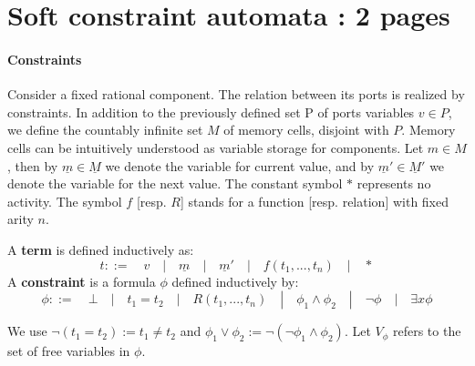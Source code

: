\section{Soft constraint automata : 2 pages}

\paragraph{Constraints}
Consider a fixed rational component. The relation between its ports is realized by constraints. In addition to the previously defined set P of ports variables $v\in P$, we define the countably infinite set $M$ of memory cells, disjoint with $P$. Memory cells can be intuitively understood as variable storage for components. Let $m \in M$, then by $\underline{m}\in \underline{M}$ we denote the variable for current value, and by $\underline{m}'\in \underline{M}'$ we denote the variable for the next value. The constant symbol $*$ represents no activity. The symbol $f$ [resp. $R$] stands for a function [resp. relation] with fixed arity $n$. 

\begin{definition} A \textbf{term} is defined inductively as:
	$$ t ::= \quad v \quad | \quad \underline{m} \quad | \quad \underline{m}' \quad | \quad f(t_1, ..., t_n) \quad | \quad * $$
	A \textbf{constraint} is a formula $\phi$ defined inductively by:
	$$ \phi ::= \quad \bot \quad |\quad t_1 = t_2 \quad|\quad R(t_1, ... , t_n) \quad|\quad \phi_1 \land \phi_2 \quad| \quad \neg \phi \quad| \quad \exists x \phi $$
\end{definition}

We use $\neg (t_1=t_2) := t_1 \not = t_2$ and $\phi_1 \lor \phi_2 := \neg (\neg \phi_1 \land \phi_2)$. Let $V_{\phi}$ refers to the set of free variables in $\phi$.

